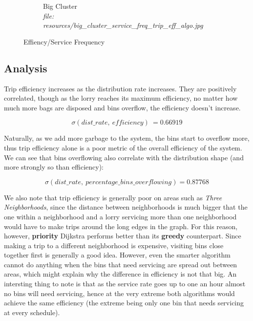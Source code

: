 \documentclass{article}
\begin{document}
\begin{figure}[H]
\begin{subfigure}[b]{.5\textwidth}
				\caption{Big Cluster\\\textit{file: resources/big\_cluster\_service\_freq\_trip\_eff\_algo.jpg}}
				\label{fig:fig9b}
			\end{subfigure}
			\label{fig:fig9}
			\caption{Effiency/Service Frequency}
		\end{figure}

		\subsection{Analysis}
		Trip efficiency increases as the distribution rate increases. They are positively correlated, though
		as the lorry reaches its maximum efficiency, no matter how much more bags are disposed and bins overflow,
		the efficiency doesn't increase.
		
		\begin{equation}
			\sigma(dist\_rate,\ efficiency)\ = 0.66919
		\end{equation} 

		Naturally, as we add more garbage to the system, the bins start to overflow more, thus trip efficiency alone
		is a poor metric of the overall efficiency of the system. We can see that bins overflowing also correlate with
		the distribution shape (and more strongly so than efficiency):

		\begin{equation}
			\sigma(dist\_rate,\ percentage\_bins\_overflowing) = 0.87768
		\end{equation}

		We also note that trip efficiency is generally poor on areas such as \textit{Three Neighborhoods}, since
		the distance between neighborhoods is much bigger that the one within a neighborhood and a lorry servicing
		more than one neighborhood would have to make trips around the long edges in the graph.
		For this reason, however, \textbf{priority} Dijkstra performs better than its \textbf{greedy} counterpart.
		Since making a trip to a different neighborhood is expensive, visiting bins close together first is generally
		a good idea. However, even the smarter algorithm cannot do anything when the bins that need servicing are
		spread out between areas, which might explain why the difference in efficiency is not that big.
		An intersting thing to note is that as the service rate goes up to one an hour almost no bins will need
		servicing, hence at the very extreme both algorithms would achieve the same efficiency (the extreme being only
		one bin that needs servicing at every schedule).
\end{document}
